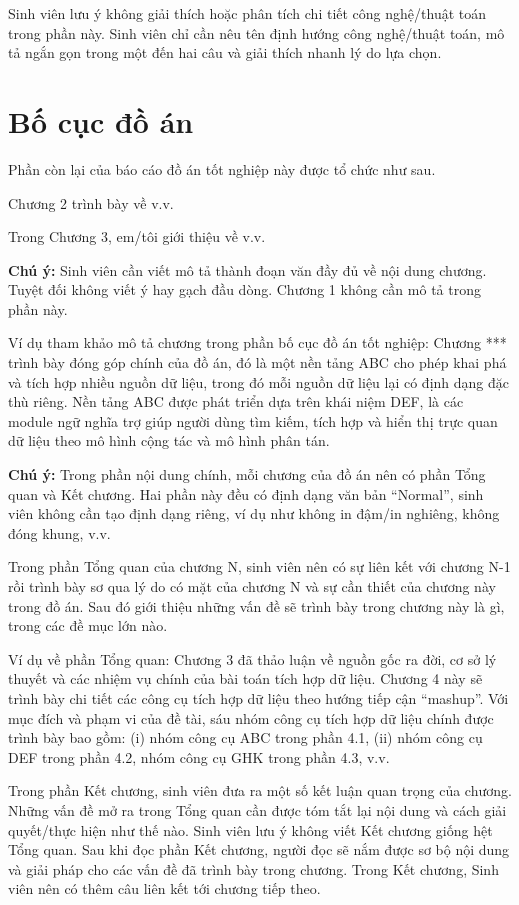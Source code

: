 \documentclass[../DoAn.tex]{subfiles}
\begin{document}
Sinh viên lưu ý không giải thích hoặc phân tích chi tiết công nghệ/thuật toán trong phần này. Sinh viên chỉ cần nêu tên định hướng công nghệ/thuật toán, mô tả ngắn gọn trong một đến hai câu và giải thích nhanh lý do lựa chọn.

\section{Bố cục đồ án}
\label{section:1.4}
Phần còn lại của báo cáo đồ án tốt nghiệp này được tổ chức như sau. 

Chương 2 trình bày về v.v. 

Trong Chương 3, em/tôi giới thiệu về v.v.

\textbf{Chú ý:} Sinh viên cần viết mô tả thành đoạn văn đầy đủ về nội dung chương. Tuyệt đối không viết ý hay gạch đầu dòng. Chương 1 không cần mô tả trong phần này. 

Ví dụ tham khảo mô tả chương trong phần bố cục đồ án tốt nghiệp: Chương *** trình bày đóng góp chính của đồ án, đó là một nền tảng ABC cho phép khai phá và tích hợp nhiều nguồn dữ liệu, trong đó mỗi nguồn dữ liệu lại có định dạng đặc thù riêng. Nền tảng ABC được phát triển dựa trên khái niệm DEF, là các module ngữ nghĩa trợ giúp người dùng tìm kiếm, tích hợp và hiển thị trực quan dữ liệu theo mô hình cộng tác và mô hình phân tán.

\textbf{Chú ý:} Trong phần nội dung chính, mỗi chương của đồ án nên có phần Tổng quan và Kết chương. Hai phần này đều có định dạng văn bản “Normal”, sinh viên không cần tạo định dạng riêng, ví dụ như không in đậm/in nghiêng, không đóng khung, v.v. 

Trong phần Tổng quan của chương N, sinh viên nên có sự liên kết với chương N-1 rồi trình bày sơ qua lý do có mặt của chương N và sự cần thiết của chương này trong đồ án. Sau đó giới thiệu những vấn đề sẽ trình bày trong chương này là gì, trong các đề mục lớn nào.

Ví dụ về phần Tổng quan: Chương 3 đã thảo luận về nguồn gốc ra đời, cơ sở lý thuyết và các nhiệm vụ chính của bài toán tích hợp dữ liệu. Chương 4 này sẽ trình bày chi tiết các công cụ tích hợp dữ liệu theo hướng tiếp cận “mashup”. Với mục đích và phạm vi của đề tài, sáu nhóm công cụ tích hợp dữ liệu chính được trình bày bao gồm: (i) nhóm công cụ ABC trong phần 4.1, (ii) nhóm công cụ DEF trong phần 4.2, nhóm công cụ GHK trong phần 4.3, v.v.

Trong phần Kết chương, sinh viên đưa ra một số kết luận quan trọng của chương. Những vấn đề mở ra trong Tổng quan cần được tóm tắt lại nội dung và cách giải quyết/thực hiện như thế nào. Sinh viên lưu ý không viết Kết chương giống hệt Tổng quan. Sau khi đọc phần Kết chương, người đọc sẽ nắm được sơ bộ nội dung và giải pháp cho các vấn đề đã trình bày trong chương. Trong Kết chương, Sinh viên nên có thêm câu liên kết tới chương tiếp theo.
\end{document}
